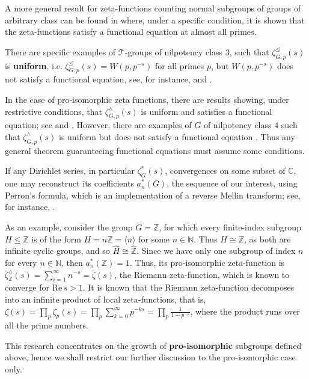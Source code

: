 \documentclass[12pt]{article}
\begin{document}
A more general result for zeta-functions counting normal subgroups of groups of arbitrary class can be found in \cite[Theorem 1.2]{Voll2} where, under a specific condition, it is shown that the zeta-functions satisfy a functional equation at almost all primes.

There are specific examples of $\mathcal{T}$-groups of nilpotency class $3$, such that $\zeta_{G,p}^{\trianglelefteq}(s)$ is \textbf{uniform}, i.e. $\zeta_{G,p}^{\trianglelefteq}(s)=W(p,p^{-s})$ for all primes $p$, but $W(p,p^{-s})$ does not satisfy a functional equation, see, for instance, \cite[Theorem 2.40]{DuSautoyWoodward} and \cite[Theorem 2.44]{DuSautoyWoodward}.

In the case of pro-isomorphic zeta functions, there are results showing, under restrictive conditions, that $\zeta_{G,p}^{\wedge}(s)$ is uniform and satisfies a functional equation; see \cite[Theorem B]{DuSautoyLubotzky} and \cite[Theorem 1.1]{Berman}. However, there are examples of $G$ of nilpotency class $4$ such that $\zeta_{G,p}^{\wedge}(s)$ is uniform but does not satisfy a functional equation \cite[Theorem 1.1]{BermanKlopsch}. Thus any general theorem guaranteeing functional equations must assume some conditions.

If any Dirichlet series, in particular $\zeta_{G}^{\ast}(s)$, convergences on some subset of $\mathbb{C}$, one may reconstruct its coefficients $a_{n}^{\ast}(G)$, the sequence of our interest, using Perron's formula, which is an implementation of a reverse Mellin transform; see, for instance, \cite[Theorem 5.1]{MontgomeryVaughan}.\par
As an example, consider the group $G=\mathbb{Z}$, for which every finite-index subgroup $H\leq{\mathbb{Z}}$ is of the form $H=n\mathbb{Z}=\langle n\rangle$ for some $n\in\mathbb{N}$. Thus $H\cong \mathbb{Z}$, as both are infinite cyclic groups, and so $\widehat{H}\cong\widehat{\mathbb{Z}}$. Since we have only one subgroup of index $n$ for every $n\in\mathbb{N}$, then $a_{n}^{\ast}(\mathbb{Z})=1$. Thus, its pro-isomorphic zeta-function is $\zeta_{\mathbb{Z}}^{\wedge}(s)=\sum_{i=1}^{\infty}n^{-s}=\zeta(s)$, the Riemann zeta-function, which is known to converge for $\mathrm{Re}\,s>1$. It is known that the Riemann zeta-function decomposes into an infinite product of local zeta-functions, that is, $\zeta(s)=\prod_p\zeta_p(s)=\prod_p\sum_{k=0}^\infty p^{-ks}=\prod_p\frac{1}{1-p^{-s}}$, where the product runs over all the prime numbers.\par
This research concentrates on the growth of \textbf{pro-isomorphic} subgroups defined above, hence we shall restrict our further discussion to the pro-isomorphic case only.
\end{document}

